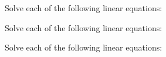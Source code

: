 \documentclass[12pt, a4paper, addpoints]{exam}
\newcommand{\bs}{\vspace{33mm}}
\newcommand{\verticalspace}{\vspace{11mm}} %
\begin{document}
\noindent 
\begin{questions}
\Large
\question Solve each of the following linear equations:
\begin{multicols}{2} %
\end{multicols}
\noindent 

\bs

\question Solve each of the following linear equations:
\begin{multicols}{3} %
\end{multicols}

\bs
\question Solve each of the following linear equations:
\begin{multicols}{3} %
\end{multicols}
\end{questions}
\end{document}
